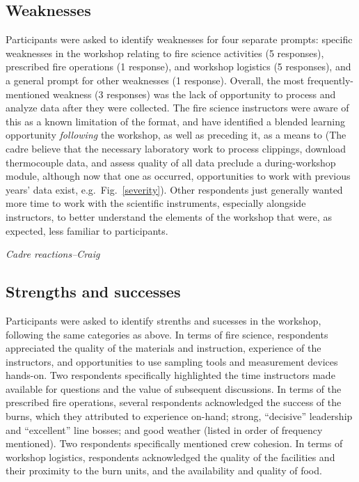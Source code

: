 \documentclass[fire,article,submit,moreauthors,pdftex]{Definitions/mdpi}
\begin{document}
\hypertarget{weaknesses}{%
\subsection{Weaknesses}\label{weaknesses}}

Participants were asked to identify weaknesses for four separate prompts: specific weaknesses in the workshop relating to fire science activities (5 responses), prescribed fire operations (1 response), and workshop logistics (5 responses), and a general prompt for other weaknesses (1 response).
Overall, the most frequently-mentioned weakness (3 responses) was the lack of opportunity to process and analyze data after they were collected.
The fire science instructors were aware of this as a known limitation of the format, and have identified a blended learning opportunity \emph{following} the workshop, as well as preceding it, as a means to (The cadre believe that the necessary laboratory work to process clippings, download thermocouple data, and assess quality of all data preclude a during-workshop module, although now that one as occurred, opportunities to work with previous years' data exist, e.g.~Fig.~\ref{severity}).
Other respondents just generally wanted more time to work with the scientific instruments, especially alongside instructors, to better understand the elements of the workshop that were, as expected, less familiar to participants.

\emph{Cadre reactions--Craig}

\hypertarget{strengths-and-successes}{%
\subsection{Strengths and successes}\label{strengths-and-successes}}

Participants were asked to identify strenths and sucesses in the workshop, following the same categories as above.
In terms of fire science, respondents appreciated the quality of the materials and instruction, experience of the instructors, and opportunities to use sampling tools and measurement devices hands-on.
Two respondents specifically highlighted the time instructors made available for questions and the value of subsequent discussions.
In terms of the prescribed fire operations, several respondents acknowledged the success of the burns, which they attributed to experience on-hand; strong, ``decisive'' leadership and ``excellent'' line bosses; and good weather (listed in order of frequency mentioned).
Two respondents specifically mentioned crew cohesion.
In terms of workshop logistics, respondents acknowledged the quality of the facilities and their proximity to the burn units, and the availability and quality of food.
\end{document}
